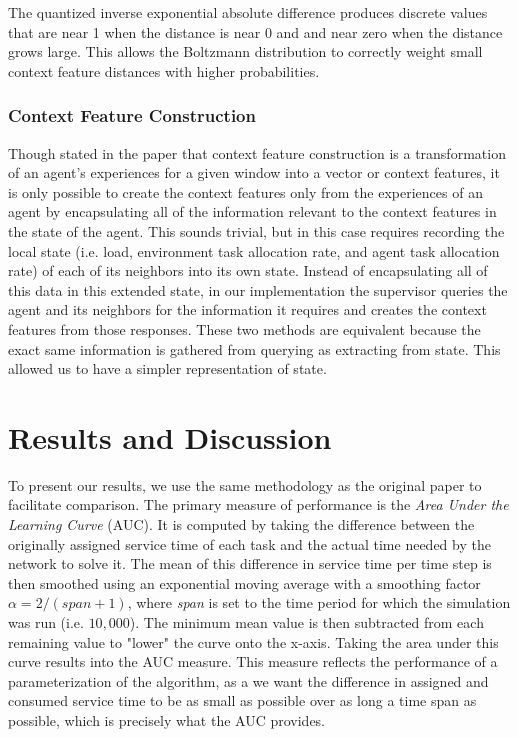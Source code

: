 \documentclass[letterpaper]{article}
\begin{document}
The quantized inverse exponential absolute difference produces discrete values that are near 1 when the distance is near 0 and and near zero when the distance grows large.  This allows the Boltzmann distribution to correctly weight small context feature distances with higher probabilities.

\subsubsection{Context Feature Construction}
Though stated in the paper that context feature construction is a transformation of an agent’s experiences for a given window into a vector or context features, it is only possible to create the context features only from the experiences of an agent by encapsulating all of the information relevant to the context features in the state of the agent. This sounds trivial, but in this case requires recording the local state (i.e. load, environment task allocation rate, and agent task allocation rate) of each of its neighbors into its own state.  Instead of encapsulating all of this data in this extended state, in our implementation the supervisor queries the agent and its neighbors for the information it requires and creates the context features from those responses.  These two methods are equivalent because the exact same information is gathered from querying as extracting from state.  This allowed us to have a simpler representation of state.

\section{Results and Discussion}
To present our results, we use the same methodology as the original paper to facilitate comparison. The primary measure of performance is the \textit{Area Under the Learning Curve} (AUC). It is computed by taking the difference between the originally assigned service time of each task and the actual time needed by the network to solve it. The mean of this difference in service time per time step is then smoothed using an exponential moving average with a smoothing factor $\alpha=2/(span+1)$, where \textit{span} is set to the time period for which the simulation was run (i.e. $10,000$). The minimum mean value is then subtracted from each remaining value to "lower" the curve onto the x-axis. Taking the area under this curve results into the AUC measure. This measure reflects the performance of a parameterization of the algorithm, as a we want the difference in assigned and consumed service time to be as small as possible over as long a time span as possible, which is precisely what the AUC provides.
\end{document}
